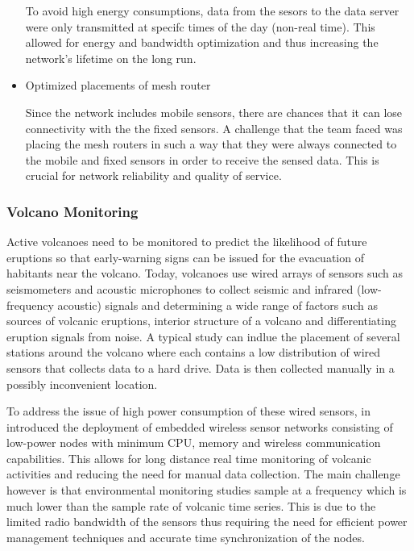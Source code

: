 \begin{itemize}
To avoid high energy consumptions, data from the sesors to the data server were only transmitted at specifc times of the day (non-real time). This allowed for energy and bandwidth optimization and thus increasing the network's lifetime on the long run.

\item Optimized placements of mesh router 

Since the network includes mobile sensors, there are chances that it can lose connectivity with the the fixed sensors. A challenge that the team faced was placing the mesh routers in such a way that they were always connected to the mobile and fixed sensors in order to receive the sensed data. This is crucial for network reliability and quality of service.
\end{itemize}

\subsubsection*{Volcano Monitoring}

Active volcanoes need to be monitored to predict the likelihood of future eruptions so that early-warning signs can be issued for the evacuation of habitants near the volcano. Today, volcanoes use wired arrays of sensors such as seismometers and acoustic microphones to collect seismic and infrared (low-frequency acoustic) signals and determining a wide range of factors such as sources of volcanic eruptions, interior structure of a volcano and differentiating eruption signals from noise. A typical study can indlue the placement of several stations around the volcano where each contains a low distribution of wired sensors that collects data to a hard drive. Data is then collected manually in a possibly inconvenient location.

To address the issue of high power consumption of these wired sensors, \citeauthor{Werner-Allen:2006:FYV:1298455.1298491} in \cite{Werner-Allen:2006:FYV:1298455.1298491} introduced the deployment of embedded wireless sensor networks consisting of low-power nodes with minimum CPU, memory and wireless communication capabilities. This allows for long distance real time monitoring of volcanic activities and reducing the need for manual data collection. The main challenge however is that environmental monitoring studies sample at a frequency which is much lower than the sample rate of volcanic time series. This is due to the limited radio bandwidth of the sensors thus requiring the need for efficient power management techniques and accurate time synchronization of the nodes. 

